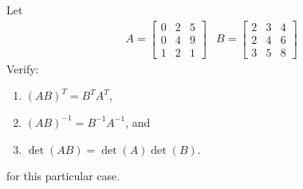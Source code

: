 \begin{Exercise}
Let
\begin{align*}
&A =
\begin{bmatrix}
0 & 2 & 5\\
0 & 4 & 9\\
1 & 2 & 1
\end{bmatrix}
&B =
\begin{bmatrix}
2 & 3 & 4\\
2 & 4 & 6\\
3 & 5 & 8
\end{bmatrix}  
\end{align*}
Verify:
\begin{enumerate}[label=(\alph*)]
\item $(AB)^T = B^TA^T$,
\item $(AB)^{-1} = B^{-1}A^{-1}$, and
\item $\det(AB) = \det(A)\det(B)$.
\end{enumerate} for this particular case. 
\end{Exercise}
